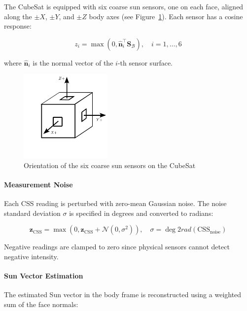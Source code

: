 The CubeSat is equipped with six coarse sun sensors, one on each face, aligned along the $\pm X$, $\pm Y$, and $\pm Z$ body axes (see Figure~\ref{fig:CSS}). Each sensor has a cosine response:

\begin{equation}
     z_i = \max\left(0, \hat{\mathbf{n}}_i^\top \mathbf{S}_\mathcal{B} \right), \quad i = 1, \dots, 6
\end{equation}

where $\hat{\mathbf{n}}_i$ is the normal vector of the $i$-th sensor surface.

\begin{figure}[H]
    \centering
    \includegraphics[width=0.4\textwidth]{figures/modelling/CSS.pdf}
    \caption{Orientation of the six coarse sun sensors on the CubeSat}
    \label{fig:CSS}
\end{figure}

\paragraph{Measurement Noise}

Each CSS reading is perturbed with zero-mean Gaussian noise. The noise standard deviation $\sigma$ is specified in degrees and converted to radians:

\begin{equation}
    \mathbf{z}_{\text{CSS}} = \max\left( 0, \mathbf{z}_{\text{CSS}} + \mathcal{N}(0, \sigma^2) \right), \quad \sigma = \deg2rad(\text{CSS}_{\text{noise}})
\end{equation}

Negative readings are clamped to zero since physical sensors cannot detect negative intensity.

\paragraph{Sun Vector Estimation}

The estimated Sun vector in the body frame is reconstructed using a weighted sum of the face normals:

